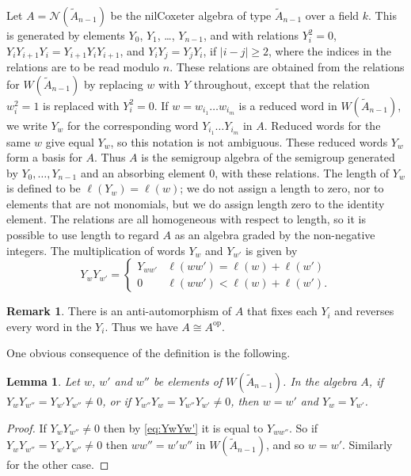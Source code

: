 \documentclass[12pt]{amsart}
\renewcommand{\ge}{\geqslant}
\newcommand{\mcN}{\mathcal{N}}
\newcommand{\op}{{\mathrm{op}}}
\numberwithin{equation}{section}
\newtheorem{lemma}[equation]{Lemma}
\theoremstyle{definition}
\newtheorem{remark}[equation]{Remark}
\begin{document}
Let $A=\mcN(\tilde A_{n-1})$ be the nilCoxeter algebra of type $\tilde
A_{n-1}$ over a field $k$. This is generated by elements $Y_0$, $Y_1$, \dots, 
$Y_{n-1}$, and with relations 
$Y_i^2=0$, $Y_iY_{i+1}Y_i=Y_{i+1}Y_iY_{i+1}$, and $Y_iY_j=Y_jY_i$, if 
$|i-j|\ge 2$,
where the indices in the relations are to be read modulo $n$. 
These relations are obtained from the relations for
$W(\tilde A_{n-1})$ by replacing $w$ with $Y$ throughout, except that 
the relation $w_i^2=1$ is replaced with $Y_i^2=0$. 
If $w=w_{i_1}\dots w_{i_m}$ is a reduced word in $W(\tilde A_{n-1})$,
we write $Y_w$ for the corresponding word $Y_{i_1}\dots Y_{i_m}$ in
$A$. Reduced words for the same $w$ give equal $Y_w$, so this notation
is not ambiguous. These reduced words $Y_w$ form a basis for $A$. Thus $A$ is
the semigroup algebra of the semigroup generated by 
$Y_0,\dots,Y_{n-1}$ and an absorbing element $0$, with these 
relations. 
The length of $Y_w$ is defined to be $\ell(Y_w)=\ell(w)$;
we do not assign a length to zero,
nor to elements that are not monomials, but we do assign length zero
to the identity element. The
relations are all homogeneous with respect to length, so it is
possible to use length to regard $A$ as an algebra graded by the
non-negative integers. The multiplication of words $Y_w$ and $Y_{w'}$
is given by
\begin{equation}\label{eq:YwYw'}
Y_wY_{w'}=\begin{cases} Y_{ww'} & \ell(ww')=\ell(w)+\ell(w') \\ 0 &
    \ell(ww') < \ell(w)+\ell(w'). \end{cases} 
\end{equation}

\begin{remark}\label{rk:anti-aut}
There is an anti-automorphism of $A$ that fixes each $Y_i$ and
reverses every word in the $Y_i$. Thus we have $A\cong A^\op$.
\end{remark}

One obvious consequence of the definition is the following.

\begin{lemma}\label{le:cancel}
Let $w$, $w'$ and $w''$ be elements of $W(\tilde A_{n-1})$. In the
algebra $A$, if
$Y_wY_{w''}=Y_{w'}Y_{w''}\ne 0$, or if
$Y_{w''}Y_w=Y_{w''}Y_{w'}\ne 0$,  then $w=w'$ and $Y_w=Y_{w'}$. 
\end{lemma}
\begin{proof}
If $Y_wY_{w''}\ne 0$ then by \eqref{eq:YwYw'} it is equal to $Y_{ww''}$. So if
$Y_wY_{w''}=Y_{w'}Y_{w''}\ne 0$ then $ww''=w'w''$ in 
$W(\tilde A_{n-1})$, and so $w=w'$. Similarly for the other case.
\end{proof}
\end{document}
